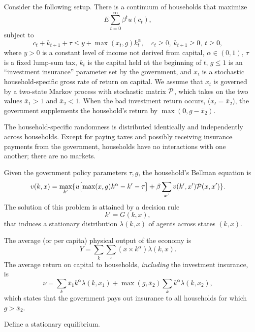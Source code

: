  
\medskip
\noindent
Consider the following setup.
There is a continuum of households that maximize
$$ E \sum_{t=0}^\infty \beta^t u(c_t) ,$$
subject to
$$ c_t + k_{t+1} + \tau \leq y + \max(x_t,g) k_t^\alpha , \quad
           c_t \geq 0,\ k_{t+1}\geq 0,\ t \geq 0, $$
where $y> 0$ is a constant level of income not derived from capital,
$\alpha \in (0,1)$, $\tau$ is a fixed lump-sum tax, $k_t$ is the
capital held at the beginning of $t$, $g \leq 1$ is an ``investment
insurance'' parameter set by the government, and $x_t$ is a
stochastic household-specific gross rate of return on capital.
We assume that $x_t$ is governed by a two-state Markov process
with stochastic matrix $\cal P$, which takes on the two values
$\bar x_1 > 1$ and $\bar x_2 < 1$. When the bad investment return
occurs, ($x_t = \bar x_2$), the government supplements the
household's return by $\max(0, g - \bar x_2)$.

  The household-specific randomness is distributed identically and
independently across households. Except for paying taxes and possibly
receiving insurance payments from the government, households have
no interactions with one another; there are no markets.

  Given the government policy parameters $\tau, g$, the household's
Bellman equation is
$$ v(k,x) = \max_{k'} \{ u \bigl[ \max(x,g) k^\alpha - k' - \tau\bigr] +
\beta \sum_{x'} v(k',x') {\cal P} (x,x') \} .$$
The solution of this problem is attained by a decision rule
$$k' = G(k,x),$$
that induces a stationary distribution $\lambda(k,x)$ of agents across
states $(k,x)$.

  The average (or per capita) physical output of the economy is
$$ Y = \sum_k \sum_x (x \times k^\alpha) \lambda(k,x) .$$
The average return on capital to households, {\it including\/}
the investment insurance, is
$$ \nu = \sum_k \bar x_1 k^\alpha \lambda(k,x_1) +
\max(g,\bar x_2) \sum_k k^\alpha \lambda(k,x_2) ,$$
which states that the government pays out
insurance to all households for which $g > \bar x_2$.

Define a stationary equilibrium.



